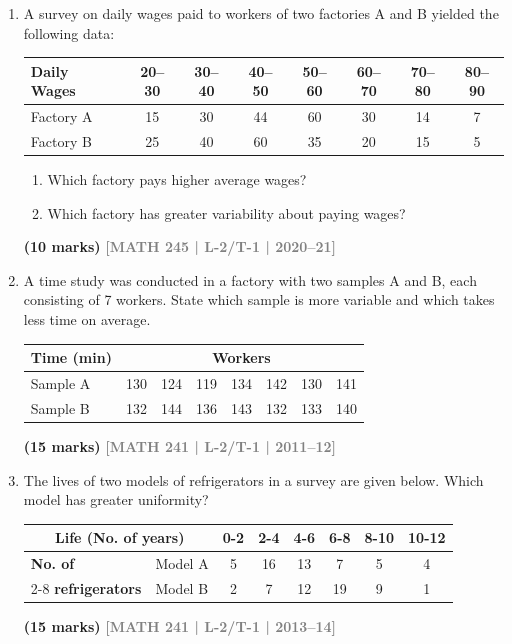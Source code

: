 \documentclass[12pt,a4paper]{article}
\newcommand{\yr}[1]{\hfill\textcolor{gray}{\small\textbf{[#1]}}}
\newcommand{\mk}[1]{\textcolor{orange!70!black}{\small\textbf{(#1 marks)}}}
\begin{document}
\begin{enumerate}

\item A survey on daily wages paid to workers of two factories A and B yielded the following data:
\begin{center}
\begin{tabular}{lccccccc}
\toprule
\textbf{Daily Wages} & 20--30 & 30--40 & 40--50 & 50--60 & 60--70 & 70--80 & 80--90 \\
\midrule
Factory A & 15 & 30 & 44 & 60 & 30 & 14 & 7 \\
Factory B & 25 & 40 & 60 & 35 & 20 & 15 & 5 \\
\bottomrule
\end{tabular}
\end{center}
\begin{enumerate}
  \item Which factory pays higher average wages?
  \item Which factory has greater variability about paying wages?
\end{enumerate}
\mk{10} \yr{MATH 245 | L-2/T-1 | 2020--21}

\item A time study was conducted in a factory with two samples A and B, each consisting of 7 workers. State which sample is more variable and which takes less time on average.
\begin{center}
\begin{tabular}{lrrrrrrr}
\toprule
\textbf{Time (min)} & \multicolumn{7}{c}{Workers} \\
\midrule
Sample A & 130 & 124 & 119 & 134 & 142 & 130 & 141 \\
Sample B & 132 & 144 & 136 & 143 & 132 & 133 & 140 \\
\bottomrule
\end{tabular}
\end{center}
\mk{15} \yr{MATH 241 | L-2/T-1 | 2011--12}

\item The lives of two models of refrigerators in a survey are given below. Which model has greater uniformity?
\begin{center}
  \renewcommand{\arraystretch}{1.3} %
\begin{tabular}{|l|l|c|c|c|c|c|c|}
\hline
\multicolumn{2}{|c|}{\textbf{Life (No. of years)}} & \textbf{0-2} & \textbf{2-4} & \textbf{4-6} & \textbf{6-8} & \textbf{8-10} & \textbf{10-12} \\ \hline
\textbf{No. of} & Model A & 5 & 16 & 13 & 7 & 5 & 4 \\ \cline{2-8} 
\textbf{refrigerators} & Model B & 2 & 7 & 12 & 19 & 9 & 1 \\ \hline
\end{tabular}
\end{center}
\mk{15} \yr{MATH 241 | L-2/T-1 | 2013--14}




\end{enumerate}
\end{document}
